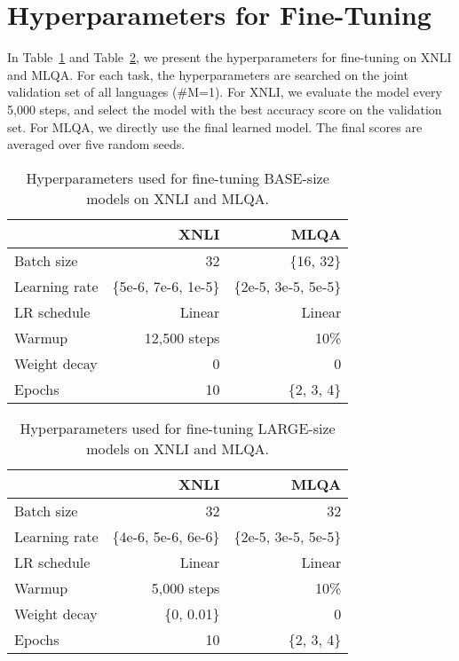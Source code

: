 \documentclass[11pt,a4paper]{article}
\begin{document}
\section{Hyperparameters for Fine-Tuning}

In Table~\ref{table:hparam1} and Table~\ref{table:hparam2}, we present the hyperparameters for fine-tuning on XNLI and MLQA. For each task, the hyperparameters are searched on the joint validation set of all languages (\#M=1). For XNLI, we evaluate the model every 5,000 steps, and select the model with the best accuracy score on the validation set. For MLQA, we directly use the final learned model. The final scores are averaged over five random seeds.

\begin{table}[t]
\centering
\scriptsize
\begin{tabular}{lrr}
\toprule
& XNLI & MLQA \\ \midrule
Batch size & 32 & \{16, 32\} \\
Learning rate & \{5e-6, 7e-6, 1e-5\} & \{2e-5, 3e-5, 5e-5\} \\
LR schedule & Linear & Linear \\
Warmup & 12,500 steps & 10\% \\
Weight decay & 0 & 0 \\
Epochs & 10 & \{2, 3, 4\} \\
\bottomrule
\end{tabular}
\caption{Hyperparameters used for fine-tuning \textsc{BASE}-size models on XNLI and MLQA.}
\label{table:hparam1}
\end{table}

\begin{table}[t]
\centering
\scriptsize
\begin{tabular}{lrr}
\toprule
& XNLI & MLQA \\ \midrule
Batch size & 32 & 32 \\
Learning rate & \{4e-6, 5e-6, 6e-6\} & \{2e-5, 3e-5, 5e-5\} \\
LR schedule & Linear & Linear \\
Warmup & 5,000 steps & 10\% \\
Weight decay & \{0, 0.01\} & 0 \\
Epochs & 10 & \{2, 3, 4\} \\
\bottomrule
\end{tabular}
\caption{Hyperparameters used for fine-tuning \textsc{LARGE}-size models on XNLI and MLQA.}
\label{table:hparam2}
\end{table}
\end{document}
